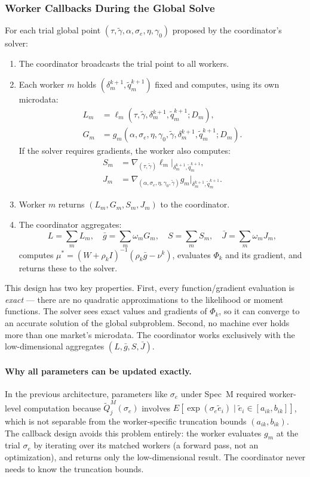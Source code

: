\documentclass[11pt]{article}
\begin{document}
\subsubsection{Worker Callbacks During the Global Solve}\label{sec:callbacks}

For each trial global point $(\tau,\tilde\gamma,\alpha,\sigma_e,\eta,\gamma_0)$ proposed by the coordinator's solver:
\begin{enumerate}[label=\arabic*.]
\item The coordinator broadcasts the trial point to all workers.
\item Each worker $m$ holds $(\delta_m^{k+1},\tilde q_m^{k+1})$ fixed and computes, using its own microdata:
\begin{align*}
L_m &= \ell_m(\tau,\tilde\gamma,\delta_m^{k+1},\tilde q_m^{k+1};D_m), \\
G_m &= g_m(\alpha,\sigma_e,\eta,\gamma_0,\tilde\gamma,\delta_m^{k+1},\tilde q_m^{k+1};D_m).
\end{align*}
If the solver requires gradients, the worker also computes:
\begin{align*}
S_m &= \nabla_{(\tau,\tilde\gamma)}\ell_m\big|_{\delta_m^{k+1},\tilde q_m^{k+1}}, \\
J_m &= \nabla_{(\alpha,\sigma_e,\eta,\gamma_0,\tilde\gamma)}g_m\big|_{\delta_m^{k+1},\tilde q_m^{k+1}}.
\end{align*}
\item Worker $m$ returns $(L_m, G_m, S_m, J_m)$ to the coordinator.
\item The coordinator aggregates:
\[
L = \sum_m L_m, \quad \bar g = \sum_m \omega_m G_m, \quad S = \sum_m S_m, \quad \bar J = \sum_m \omega_m J_m,
\]
computes $\mu^* = (W+\rho_k I)^{-1}(\rho_k\bar g - \nu^k)$, evaluates $\Phi_k$ and its gradient, and returns these to the solver.
\end{enumerate}

This design has two key properties. First, every function/gradient evaluation is \emph{exact} --- there are no quadratic approximations to the likelihood or moment functions. The solver sees exact values and gradients of $\Phi_k$, so it can converge to an accurate solution of the global subproblem. Second, no machine ever holds more than one market's microdata. The coordinator works exclusively with the low-dimensional aggregates $(L, \bar g, S, \bar J)$.

\paragraph{Why all parameters can be updated exactly.} In the previous architecture, parameters like $\sigma_e$ under Spec~M required worker-level computation because $\tilde Q_j^M(\sigma_e)$ involves $E[\exp(\sigma_e\tilde e_i)\mid \tilde e_i\in[a_{ik},b_{ik}]]$, which is not separable from the worker-specific truncation bounds $(a_{ik},b_{ik})$. The callback design avoids this problem entirely: the worker evaluates $g_m$ at the trial $\sigma_e$ by iterating over its matched workers (a forward pass, not an optimization), and returns only the low-dimensional result. The coordinator never needs to know the truncation bounds.
\end{document}
